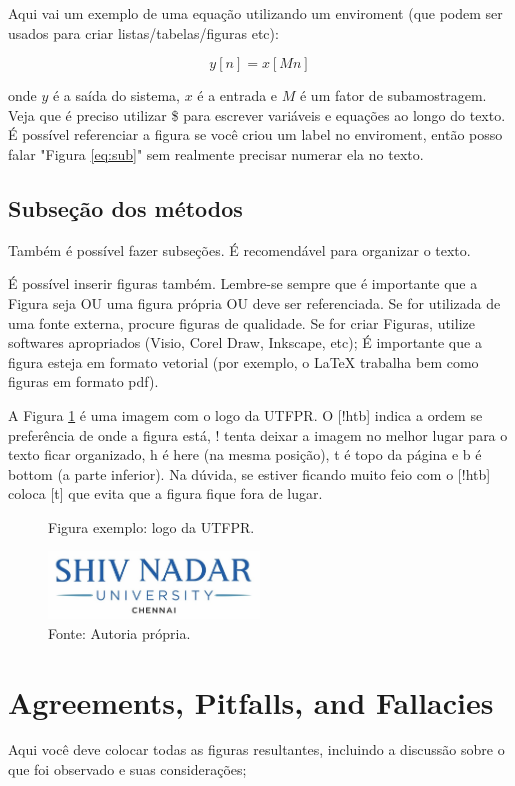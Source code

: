 \documentclass[12pt,a4paper, india]{article}
\begin{document}
\par
Aqui vai um exemplo de uma equação utilizando um enviroment (que podem ser usados para criar listas/tabelas/figuras etc): 

\begin{equation}
\label{eq:sub}
y[n] = x[Mn]
\end{equation}

onde $y$ é a saída do sistema, $x$ é a entrada e $M$ é um fator de subamostragem. Veja que é preciso utilizar \$ para escrever variáveis e equações ao longo do texto. É possível referenciar a figura se você criou um label no enviroment, então posso falar "Figura \ref{eq:sub}" sem realmente precisar numerar ela no texto. 



\subsection{Subseção dos métodos}

Também é possível fazer subseções. É recomendável para organizar o texto.

É possível inserir figuras também. Lembre-se sempre que é importante que a Figura seja OU uma figura própria OU deve ser referenciada. Se for utilizada de uma fonte externa, procure figuras de qualidade. Se for criar Figuras, utilize softwares apropriados (Visio, Corel Draw, Inkscape, etc); É importante que a figura esteja em formato vetorial (por exemplo, o LaTeX trabalha bem como figuras em formato pdf).


\par A Figura \ref{fig:exemplo} é uma imagem com o logo da UTFPR. O [!htb] indica a ordem se preferência de onde a figura está, ! tenta deixar a imagem no melhor lugar para o texto ficar organizado, h é here (na mesma posição), t é topo da página e b é bottom (a parte inferior). Na dúvida, se estiver ficando muito feio com o [!htb] coloca [t] que evita que a figura fique fora de lugar.

\begin{figure}[t]
    \centering
    \caption{Figura exemplo: logo da UTFPR.}
    \includegraphics[width=0.5\textwidth]{snulogo.jpg}
    \caption*{Fonte: Autoria própria.} %
    \label{fig:exemplo}
\end{figure}



\section{Agreements, Pitfalls, and Fallacies}

Aqui você deve colocar todas as figuras resultantes, incluindo a discussão sobre o que foi observado e suas considerações; 

\printbibliography
\end{document}
